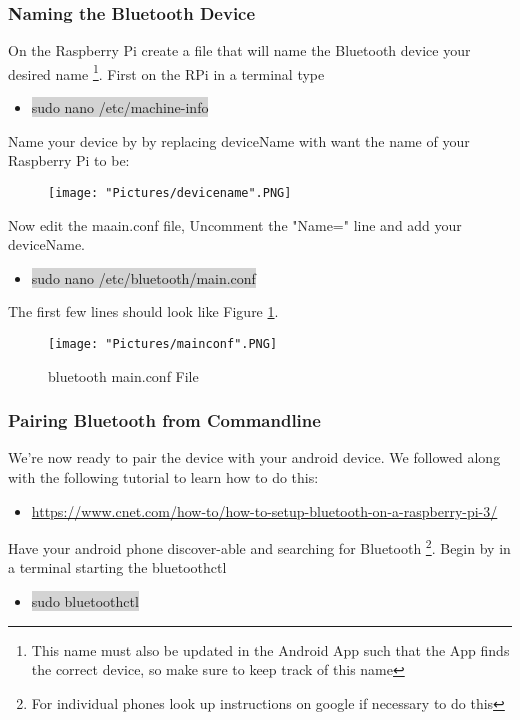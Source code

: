 \documentclass[12pt]{article}
\begin{document}
\subsubsection{Naming the Bluetooth Device}

On the Raspberry Pi create a file that will name the Bluetooth device your desired name \footnote{This name must also be updated in the Android App such that the App finds the correct device, so make sure to keep track of this name}. First on the RPi in a terminal type 
\begin{itemize}
	\item[] \colorbox{lightgray}{sudo nano /etc/machine-info} 
\end{itemize}
\noindent Name your device by by replacing deviceName with want the name of your Raspberry Pi to be:

\begin{figure}[H]
 	\centering
	\texttt{[image: "Pictures/devicename".PNG]}
\end{figure}

\noindent Now edit the maain.conf file, Uncomment the "Name=" line and add your deviceName. 
\begin{itemize}
	\item[] \colorbox{lightgray}{sudo nano /etc/bluetooth/main.conf} 
\end{itemize}

\noindent The first few lines should look like Figure \ref{conf}.

\begin{figure}[H]
 	\centering
	\texttt{[image: "Pictures/mainconf".PNG]}
	\caption{bluetooth main.conf File}
	\label{conf}
\end{figure}

\subsubsection{Pairing Bluetooth from Commandline}
We're now ready to pair the device with your android device. We followed along with the following tutorial to learn how to do this:

\begin{itemize}
	\item \href{https://www.cnet.com/how-to/how-to-setup-bluetooth-on-a-raspberry-pi-3/}{https://www.cnet.com/how-to/how-to-setup-bluetooth-on-a-raspberry-pi-3/}
\end{itemize}

Have your android phone discover-able and searching for Bluetooth \footnote{For individual phones look up instructions on google if necessary to do this}. Begin by in a terminal starting the bluetoothctl
\begin{itemize}
	\item[] \colorbox{lightgray}{sudo bluetoothctl}
\end{itemize}
\end{document}
